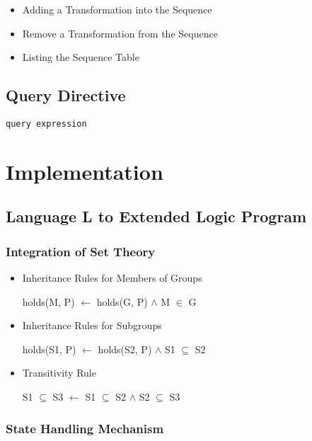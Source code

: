 \documentclass{llncs}
\begin{document}
        \begin{itemize}
          \item Adding a Transformation into the Sequence
          \item Remove a Transformation from the Sequence
          \item Listing the Sequence Table
        \end{itemize}

    \subsection{Query Directive}

      \begin{verbatim}
query expression
      \end{verbatim}

  \section{Implementation}

    \subsection{Language L to Extended Logic Program}

      \subsubsection{Integration of Set Theory}

        \begin{itemize}
          \item
            Inheritance Rules for Members of Groups

            holds(M, P) $\leftarrow$ holds(G, P) $\land$ M $\in$ G
          \item
            Inheritance Rules for Subgroups

            holds(S1, P) $\leftarrow$ holds(S2, P) $\land$ S1 $\subseteq$ S2
          \item
            Transitivity Rule

            S1 $\subseteq$ S3 $\leftarrow$ S1 $\subseteq$ S2 $\land$ S2 $\subseteq$ S3
        \end{itemize}

      \subsubsection{State Handling Mechanism}
\end{document}
